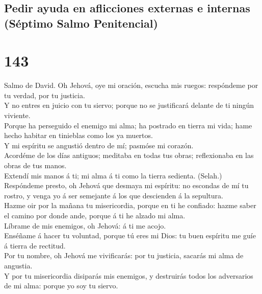 \hypertarget{pedir-ayuda-en-aflicciones-externas-e-internas-suxe9ptimo-salmo-penitencial}{%
\subsection{Pedir ayuda en aflicciones externas e internas (Séptimo
Salmo
Penitencial)}\label{pedir-ayuda-en-aflicciones-externas-e-internas-suxe9ptimo-salmo-penitencial}}

\hypertarget{section-19-143}{%
\section{143}\label{section-19-143}}

 Salmo de David. Oh Jehová, oye mi oración, escucha mis
ruegos: respóndeme por tu verdad, por tu justicia.\\
 Y no entres en juicio con tu siervo; porque no se
justificará delante de ti ningún viviente.\\
 Porque ha perseguido el enemigo mi alma; ha postrado en
tierra mi vida; hame hecho habitar en tinieblas como los ya muertos.\\
 Y mi espíritu se angustió dentro de mí; pasmóse mi
corazón.\\
 Acordéme de los días antiguos; meditaba en todas tus
obras; reflexionaba en las obras de tus manos.\\
 Extendí mis manos á ti; mi alma á ti como la tierra
sedienta. (Selah.)\\
 Respóndeme presto, oh Jehová que desmaya mi espíritu: no
escondas de mí tu rostro, y venga yo á ser semejante á los que
descienden á la sepultura.\\
 Hazme oir por la mañana tu misericordia, porque en ti he
confiado: hazme saber el camino por donde ande, porque á ti he alzado mi
alma.\\
 Líbrame de mis enemigos, oh Jehová: á ti me acojo.\\
 Enséñame á hacer tu voluntad, porque tú eres mi Dios: tu
buen espíritu me guíe á tierra de rectitud.\\
 Por tu nombre, oh Jehová me vivificarás: por tu
justicia, sacarás mi alma de angustia.\\
 Y por tu misericordia disiparás mis enemigos, y
destruirás todos los adversarios de mi alma: porque yo soy tu siervo.

